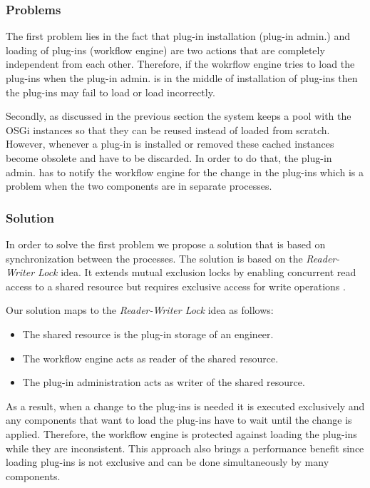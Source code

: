 \subsubsection{Problems}

The first problem lies in the fact that plug-in installation (plug-in admin.) and loading of plug-ins (workflow engine) are two actions that are completely independent from each other. Therefore, if the wokrflow engine tries to load the plug-ins when the plug-in admin. is in the middle of installation of plug-ins then the plug-ins may fail to load or load incorrectly. 

Secondly, as discussed in the previous section the system keeps a pool with the OSGi instances so that they can be reused instead of loaded from scratch. However, whenever a plug-in is installed or removed these cached instances become obsolete and have to be discarded. In order to do that, the plug-in admin. has to notify the workflow engine for the change in the plug-ins which is a problem when the two components are in separate processes.

\subsubsection{Solution}

In order to solve the first problem we propose a solution that is based on synchronization between the processes. The solution is based on the \textit{Reader-Writer Lock} idea. It extends mutual exclusion locks by enabling concurrent read access to a shared resource but requires exclusive access for write operations \cite{lev2009scalable}.

Our solution maps to the \textit{Reader-Writer Lock} idea as follows:
\begin{itemize}
	\item The shared resource is the plug-in storage of an engineer.
	\item The workflow engine acts as reader of the shared resource.
	\item The plug-in administration acts as writer of the shared resource.
\end{itemize}

As a result, when a change to the plug-ins is needed it is executed exclusively and any components that want to load the plug-ins have to wait until the change is applied. Therefore, the workflow engine is protected against loading the plug-ins while they are inconsistent. This approach also brings a performance benefit since loading plug-ins is not exclusive and can be done simultaneously by many components. 

